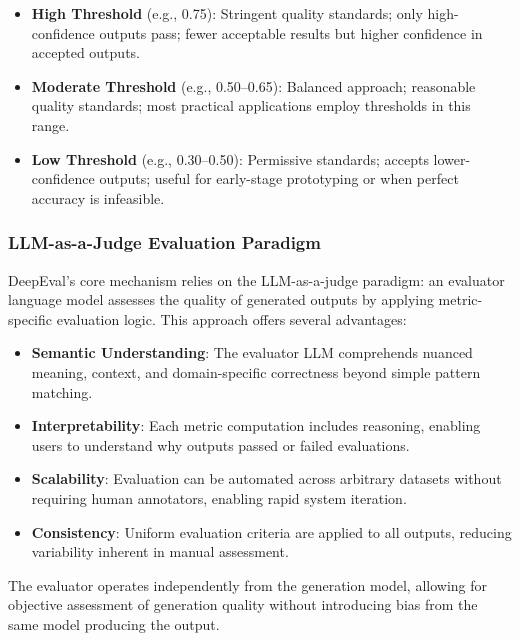\begin{itemize}
    \item \textbf{High Threshold} (e.g., 0.75): Stringent quality standards; only high-confidence outputs pass; fewer acceptable results but higher confidence in accepted outputs.
    
    \item \textbf{Moderate Threshold} (e.g., 0.50--0.65): Balanced approach; reasonable quality standards; most practical applications employ thresholds in this range.
    
    \item \textbf{Low Threshold} (e.g., 0.30--0.50): Permissive standards; accepts lower-confidence outputs; useful for early-stage prototyping or when perfect accuracy is infeasible.
\end{itemize}


\subsubsection{LLM-as-a-Judge Evaluation Paradigm}

DeepEval's core mechanism relies on the LLM-as-a-judge paradigm: an evaluator language model assesses the quality of generated outputs by applying metric-specific evaluation logic. This approach offers several advantages:

\begin{itemize}
    \item \textbf{Semantic Understanding}: The evaluator LLM comprehends nuanced meaning, context, and domain-specific correctness beyond simple pattern matching.
    
    \item \textbf{Interpretability}: Each metric computation includes reasoning, enabling users to understand why outputs passed or failed evaluations.
    
    \item \textbf{Scalability}: Evaluation can be automated across arbitrary datasets without requiring human annotators, enabling rapid system iteration.
    
    \item \textbf{Consistency}: Uniform evaluation criteria are applied to all outputs, reducing variability inherent in manual assessment.
\end{itemize}

The evaluator operates independently from the generation model, allowing for objective assessment of generation quality without introducing bias from the same model producing the output.

